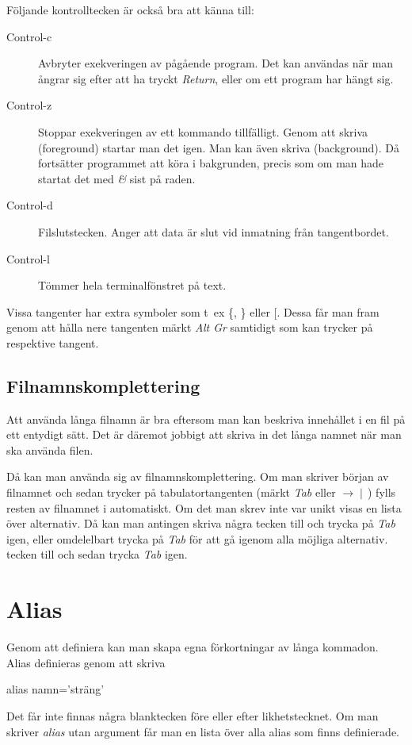 \documentclass[a4paper,twocolumn]{book}
\begin{document}
Följande kontrolltecken är också bra att känna till:
\begin{description}
\item[Control-c] Avbryter exekveringen av pågående program. Det kan
  användas när man ångrar sig efter att ha tryckt \emph{Return}, eller
  om ett program har hängt sig.
\item[Control-z] Stoppar exekveringen av ett kommando
  tillfälligt. Genom att skriva  (foreground) startar man
  det igen. Man kan även skriva  (background). Då
  fortsätter programmet att köra i bakgrunden, precis som om man hade
  startat det med \emph{\&} sist på raden.
\item[Control-d] Filslutstecken. Anger att data är slut vid inmatning
  från tangentbordet.
\item[Control-l] Tömmer hela terminalfönstret på text.
\end{description}

Vissa tangenter har extra symboler som t~ex \{, \} eller [. Dessa får
man fram genom att hålla nere tangenten märkt \emph{Alt Gr}
samtidigt som kan trycker på respektive tangent.

\subsection{Filnamnskomplettering}

Att använda långa filnamn är bra eftersom
man kan beskriva innehållet i en fil på ett entydigt sätt. Det är
däremot jobbigt att skriva in det långa namnet när man ska använda
filen.

Då kan man använda sig av filnamnskomplettering. Om man skriver början
av filnamnet och sedan trycker på tabulatortangenten (märkt \emph{Tab}
eller $\rightarrow\!\mid\,$) fylls resten av filnamnet i automatiskt. Om
det man skrev inte var unikt visas en lista över alternativ. Då kan man
antingen skriva några tecken till och trycka på \emph{Tab} igen, eller
omdelelbart trycka på \emph{Tab} för att gå igenom alla möjliga alternativ.
tecken till och sedan trycka \emph{Tab} igen.

\section{Alias}

Genom att definiera  kan man skapa egna förkortningar
av långa kommadon. Alias definieras genom att skriva
\begin{ttquote}
  alias namn='sträng'
\end{ttquote}
Det får inte finnas några blanktecken före eller efter
likhetstecknet. Om man skriver \emph{alias} utan argument får man en
lista över alla alias som finns definierade.
\end{document}
